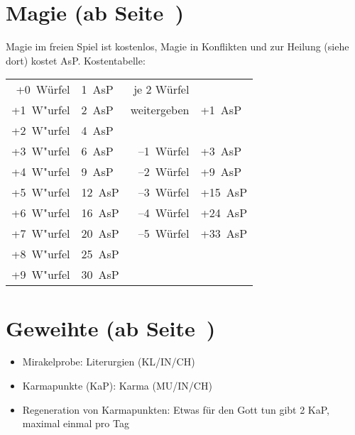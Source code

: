 \section[Magie]{Magie (ab Seite~\pageref{Ch:Magie})}
Magie im freien Spiel ist kostenlos, Magie in Konflikten und zur Heilung (siehe dort) kostet AsP. Kostentabelle:
  \begin{tabular}[C]{|rlrl|}
  \hline
    +0~Würfel & 1~AsP & je 2 Würfel & \\
    +1~W"urfel & 2~AsP & weitergeben & +1~AsP \\ 
    +2~W"urfel & 4~AsP & & \\
    +3~W"urfel & 6~AsP &--1~Würfel & +3~AsP\\
    +4~W"urfel & 9~AsP & --2~Würfel & +9~AsP\\ 
    +5~W"urfel & 12~AsP &--3~Würfel & +15~AsP\\
    +6~W"urfel & 16~AsP &--4~Würfel & +24~AsP \\
    +7~W"urfel & 20~AsP &--5~Würfel & +33~AsP \\
    +8~W"urfel & 25~AsP && \\
    +9~W"urfel & 30~AsP && \\
  \hline
  \end{tabular}
  
\section[Geweihte]{Geweihte (ab Seite~\pageref{Ch:Geweihte})}
\begin{itemize}
	\item Mirakelprobe: Literurgien (KL/IN/CH)
	\item Karmapunkte (KaP): Karma (MU/IN/CH)
	\item Regeneration von Karmapunkten: Etwas für den Gott tun gibt 2 KaP, maximal einmal pro Tag
\end{itemize}

